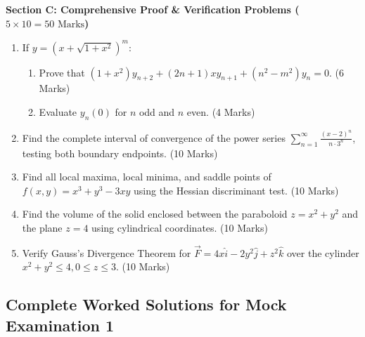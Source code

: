 \begin{mockexam}
\medskip
\noindent\textbf{Section C: Comprehensive Proof \& Verification Problems ($5 \times 10 = 50\text{ Marks}$)}
\begin{enumerate}[leftmargin=1.5em, start=17]
    \item If $y = (x + \sqrt{1+x^2})^m$:
    \begin{enumerate}[label=(\alph*)]
        \item Prove that $(1+x^2)y_{n+2} + (2n+1)xy_{n+1} + (n^2-m^2)y_n = 0$. (6 Marks)
        \item Evaluate $y_n(0)$ for $n$ odd and $n$ even. (4 Marks)
    \end{enumerate}
    \item Find the complete interval of convergence of the power series $\sum_{n=1}^\infty \frac{(x-2)^n}{n \cdot 3^n}$, testing both boundary endpoints. (10 Marks)
    \item Find all local maxima, local minima, and saddle points of $f(x,y) = x^3 + y^3 - 3xy$ using the Hessian discriminant test. (10 Marks)
    \item Find the volume of the solid enclosed between the paraboloid $z = x^2+y^2$ and the plane $z = 4$ using cylindrical coordinates. (10 Marks)
    \item Verify Gauss's Divergence Theorem for $\vec{F} = 4x\hat{i} - 2y^2\hat{j} + z^2\hat{k}$ over the cylinder $x^2+y^2 \le 4, 0 \le z \le 3$. (10 Marks)
\end{enumerate}
\end{mockexam}

\subsection{Complete Worked Solutions for Mock Examination 1}

